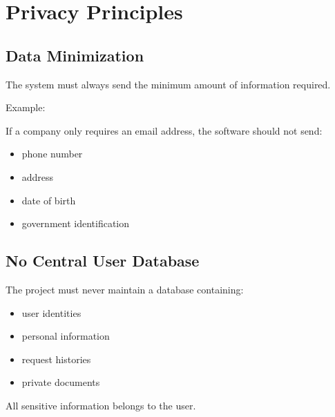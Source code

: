 
\chapter{Privacy Principles}

\section{Data Minimization}
The system must always send the minimum amount of information required.

Example:

If a company only requires an email address, the software should not send:
\begin{itemize}
	\item phone number
	\item address
	\item date of birth
	\item government identification
\end{itemize}

\section{No Central User Database}
The project must never maintain a database containing:
\begin{itemize}
	\item user identities
	\item personal information
	\item request histories
	\item private documents
\end{itemize}

All sensitive information belongs to the user.

\sentinelchapterend
